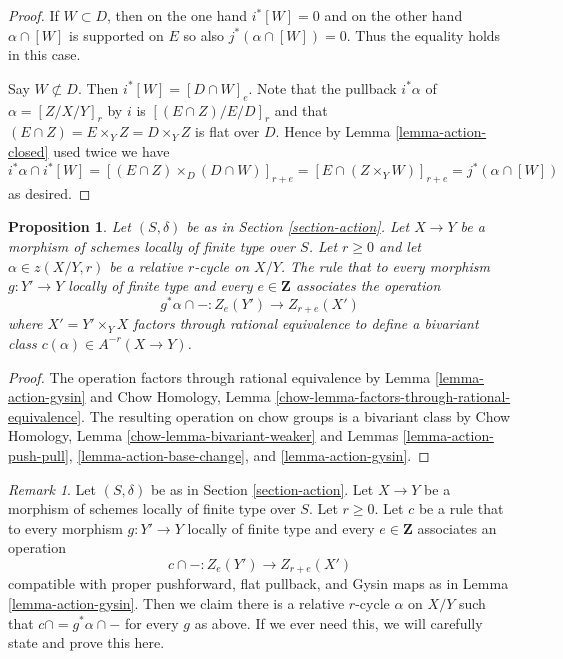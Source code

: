 \documentclass{stacks-project}
\theoremstyle{plain}
\newtheorem{proposition}[subsection]{Proposition}
\theoremstyle{definition}
\theoremstyle{remark}
\newtheorem{remark}[subsection]{Remark}
\numberwithin{equation}{subsection}
\begin{document}
\begin{proof}
\medskip\noindent
If $W \subset D$, then on the one hand $i^*[W] = 0$ and on the
other hand $\alpha \cap [W]$ is supported on $E$ so also
$j^*(\alpha \cap [W]) = 0$. Thus the equality holds in this case.

\medskip\noindent
Say $W \not \subset D$. Then $i^*[W] = [D \cap W]_e$.
Note that the pullback $i^*\alpha$ of $\alpha = [Z/X/Y]_r$
by $i$ is $[(E \cap Z)/E/D]_r$ and that
$(E \cap Z) = E \times_Y Z = D \times_Y Z$
is flat over $D$. Hence by Lemma \ref{lemma-action-closed}
used twice we have
$$
i^*\alpha \cap i^*[W] =
[(E \cap Z) \times_D (D \cap W)]_{r + e} =
[E \cap (Z \times_Y W)]_{r + e} =
j^*(\alpha \cap [W])
$$
as desired.
\end{proof}

\begin{proposition}
\label{proposition-get-bivariant-class}
Let $(S, \delta)$ be as in Section \ref{section-action}. Let $X \to Y$
be a morphism of schemes locally of finite type over $S$. Let $r \geq 0$
and let $\alpha \in z(X/Y, r)$ be a relative $r$-cycle on $X/Y$.
The rule that to every morphism $g : Y' \to Y$ locally of finite type
and every $e \in \mathbf{Z}$ associates the operation
$$
g^*\alpha \cap - : Z_e(Y') \to Z_{r + e}(X')
$$
where $X' = Y' \times_Y X$ factors through rational equivalence to
define a bivariant class $c(\alpha) \in A^{-r}(X \to Y)$.
\end{proposition}

\begin{proof}
The operation factors through rational equivalence by
Lemma \ref{lemma-action-gysin} and
Chow Homology, Lemma \ref{chow-lemma-factors-through-rational-equivalence}.
The resulting operation on chow groups is a bivariant class by
Chow Homology, Lemma \ref{chow-lemma-bivariant-weaker}
and
Lemmas \ref{lemma-action-push-pull}, \ref{lemma-action-base-change}, and
\ref{lemma-action-gysin}.
\end{proof}

\begin{remark}
\label{remark-characterize-relative-cycles}
Let $(S, \delta)$ be as in Section \ref{section-action}. Let $X \to Y$
be a morphism of schemes locally of finite type over $S$. Let $r \geq 0$.
Let $c$ be a rule that to every morphism $g : Y' \to Y$ locally of finite
type and every $e \in \mathbf{Z}$ associates an operation
$$
c \cap - : Z_e(Y') \to Z_{r + e}(X')
$$
compatible with proper pushforward, flat pullback, and Gysin maps as in
Lemma \ref{lemma-action-gysin}. Then we claim there is a relative $r$-cycle
$\alpha$ on $X/Y$ such that $c \cap = g^*\alpha \cap -$ for every $g$ as above.
If we ever need this, we will carefully state and prove this here.
\end{remark}
\end{document}
